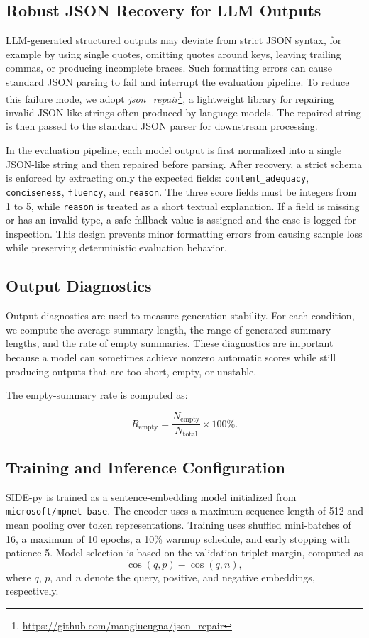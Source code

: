 \subsection{Robust JSON Recovery for LLM Outputs}

LLM-generated structured outputs may deviate from strict JSON syntax, for example by using single quotes, omitting quotes around keys, leaving trailing commas, or producing incomplete braces. Such formatting errors can cause standard JSON parsing to fail and interrupt the evaluation pipeline. To reduce this failure mode, we adopt \textit{json\_repair}\footnote{\url{https://github.com/mangiucugna/json_repair}}, a lightweight library for repairing invalid JSON-like strings often produced by language models. The repaired string is then passed to the standard JSON parser for downstream processing.

In the evaluation pipeline, each model output is first normalized into a single JSON-like string and then repaired before parsing. After recovery, a strict schema is enforced by extracting only the expected fields: \texttt{content\_adequacy}, \texttt{conciseness}, \texttt{fluency}, and \texttt{reason}. The three score fields must be integers from 1 to 5, while \texttt{reason} is treated as a short textual explanation. If a field is missing or has an invalid type, a safe fallback value is assigned and the case is logged for inspection. This design prevents minor formatting errors from causing sample loss while preserving deterministic evaluation behavior.

\subsection{Output Diagnostics}

Output diagnostics are used to measure generation stability. For each condition, we compute the average summary length, the range of generated summary lengths, and the rate of empty summaries. These diagnostics are important because a model can sometimes achieve nonzero automatic scores while still producing outputs that are too short, empty, or unstable.

The empty-summary rate is computed as:

\[
R_{\text{empty}}
=
\frac{
N_{\text{empty}}
}{
N_{\text{total}}
}
\times 100\%.
\]

\subsection{Training and Inference Configuration}
SIDE-py is trained as a sentence-embedding model initialized from \texttt{microsoft/mpnet-base}. The encoder uses a maximum sequence length of 512 and mean pooling over token representations. Training uses shuffled mini-batches of 16, a maximum of 10 epochs, a 10\% warmup schedule, and early stopping with patience 5. Model selection is based on the validation triplet margin, computed as
\[
\cos(q,p)-\cos(q,n),
\]
where \(q\), \(p\), and \(n\) denote the query, positive, and negative embeddings, respectively.

